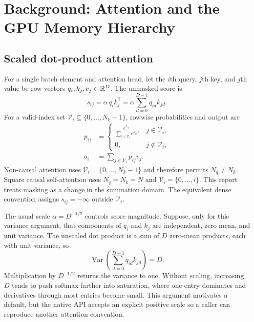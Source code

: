 \chapter{Background: Attention and the GPU Memory Hierarchy}
\label{chap:background}

\section{Scaled dot-product attention}

For a single batch element and attention head, let the $i$th query, $j$th key, and $j$th value be row vectors $q_i,k_j,v_j\in\mathbb{R}^D$. The unmasked score is
\begin{equation}
  s_{ij}=\alpha\,q_i k_j^{\mathsf T}
  =\alpha\sum_{d=0}^{D-1}q_{id}k_{jd}.
  \label{eq:score}
\end{equation}
For a valid-index set $\mathcal V_i\subseteq\{0,\ldots,N_k-1\}$, rowwise probabilities and output are
\begin{align}
  p_{ij} &=
  \begin{cases}
    \displaystyle\frac{e^{s_{ij}}}{\sum_{t\in\mathcal V_i}e^{s_{it}}},&j\in\mathcal V_i,\\[2mm]
    0,&j\notin\mathcal V_i,
  \end{cases}
  \label{eq:probability}\\
  o_i &= \sum_{j\in\mathcal V_i}p_{ij}v_j.
  \label{eq:output-row}
\end{align}
Non-causal attention uses $\mathcal V_i=\{0,\ldots,N_k-1\}$ and therefore permits $N_q\neq N_k$. Square causal self-attention uses $N_q=N_k=N$ and $\mathcal V_i=\{0,\ldots,i\}$. This report treats masking as a change in the summation domain. The equivalent dense convention assigns $s_{ij}=-\infty$ outside $\mathcal V_i$.

The usual scale $\alpha=D^{-1/2}$ controls score magnitude. Suppose, only for this variance argument, that components of $q_i$ and $k_j$ are independent, zero mean, and unit variance. The unscaled dot product is a sum of $D$ zero-mean products, each with unit variance, so
\begin{equation}
  \operatorname{Var}\!\left(\sum_{d=0}^{D-1}q_{id}k_{jd}\right)=D.
\end{equation}
Multiplication by $D^{-1/2}$ returns the variance to one. Without scaling, increasing $D$ tends to push softmax farther into saturation, where one entry dominates and derivatives through most entries become small. This argument motivates a default, but the native API accepts an explicit positive scale so a caller can reproduce another attention convention.

